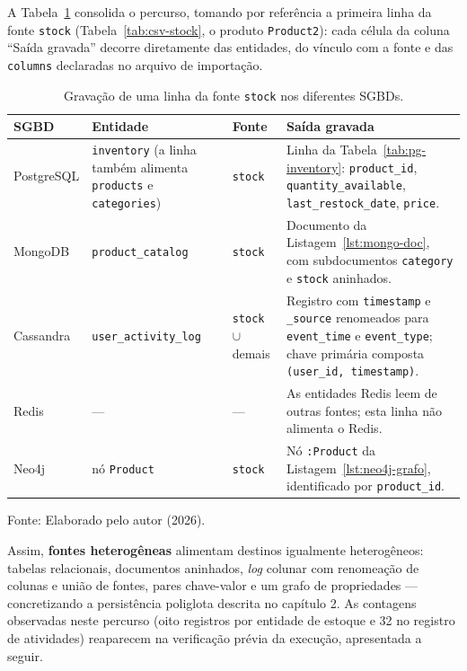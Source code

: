 A Tabela~\ref{tab:exemplo-ecommerce} consolida o percurso, tomando por referência a
primeira linha da fonte \texttt{stock} (Tabela~\ref{tab:csv-stock}, o produto
\texttt{Product2}): cada célula da coluna ``Saída gravada'' decorre diretamente das
entidades, do vínculo com a fonte e das \texttt{columns} declaradas no arquivo de
importação.

\begin{table}[H]
  \caption{Gravação de uma linha da fonte \texttt{stock} nos diferentes SGBDs.}
  \label{tab:exemplo-ecommerce}
  \centering
  \setlength{\extrarowheight}{8pt}%
  \begin{tabular}{
    >{\raggedright\arraybackslash}p{2.15cm}
    >{\raggedright\arraybackslash}p{3.2cm}
    >{\raggedright\arraybackslash}p{2.6cm}
    >{\raggedright\arraybackslash}p{5.3cm}
  }
    \toprule
    \textbf{SGBD} & \textbf{Entidade} & \textbf{Fonte} & \textbf{Saída gravada} \\
    \midrule
    PostgreSQL & \texttt{inventory} (a linha também alimenta \texttt{products} e \texttt{categories}) & \texttt{stock} & Linha da Tabela~\ref{tab:pg-inventory}: \texttt{product\_\allowbreak id}, \texttt{quantity\_\allowbreak available}, \texttt{last\_\allowbreak restock\_\allowbreak date}, \texttt{price}. \\
    MongoDB & \texttt{product\_catalog} & \texttt{stock} & Documento da Listagem~\ref{lst:mongo-doc}, com subdocumentos \texttt{category} e \texttt{stock} aninhados. \\
    Cassandra & \texttt{user\_\allowbreak activity\_\allowbreak log} & \texttt{stock} $\cup$ demais & Registro com \texttt{timestamp} e \texttt{\_source} renomeados para \texttt{event\_\allowbreak time} e \texttt{event\_\allowbreak type}; chave primária composta \texttt{(user\_\allowbreak id, timestamp)}. \\
    Redis & --- & --- & As entidades Redis leem de outras fontes; esta linha não alimenta o Redis. \\
    Neo4j & nó \texttt{Product} & \texttt{stock} & Nó \texttt{:Product} da Listagem~\ref{lst:neo4j-grafo}, identificado por \texttt{product\_\allowbreak id}. \\
    \bottomrule
  \end{tabular}
  \par\vspace{4pt}
  {\footnotesize Fonte: Elaborado pelo autor (2026).}
\end{table}

Assim, \textbf{fontes heterogêneas} alimentam destinos igualmente heterogêneos: tabelas
relacionais, documentos aninhados, \textit{log} colunar com renomeação de colunas e união
de fontes, pares chave-valor e um grafo de propriedades --- concretizando a persistência
poliglota descrita no capítulo 2. As contagens observadas neste percurso (oito registros
por entidade de estoque e 32 no registro de atividades) reaparecem na verificação prévia
da execução, apresentada a seguir.


